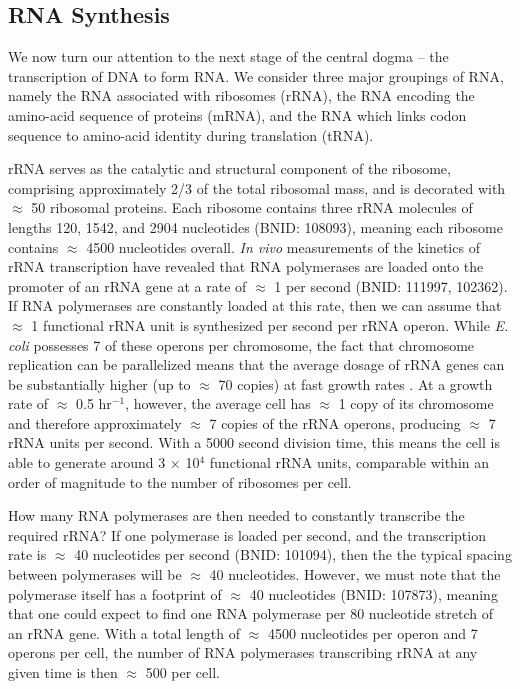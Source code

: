 \subsection{RNA Synthesis}\label{sec:RNA_synthesis}
We now turn our attention to the next stage of the central dogma -- the
transcription of DNA to form RNA. We consider three major groupings
of RNA, namely the RNA associated with ribosomes (rRNA), the RNA encoding the
amino-acid sequence of proteins (mRNA), and the RNA which links codon
sequence to amino-acid identity during translation (tRNA).


rRNA serves as the catalytic and structural component of the ribosome,
comprising approximately 2/3 of the total ribosomal mass, and is decorated
with $\approx$ 50 ribosomal proteins. Each ribosome contains three rRNA
molecules of lengths 120, 1542, and 2904 nucleotides (BNID: 108093), meaning
each ribosome contains $\approx$ 4500 nucleotides overall. \textit{In vivo}
measurements of the kinetics of rRNA transcription have revealed that RNA
polymerases are loaded onto the promoter of an rRNA gene at a rate of
$\approx$ 1 per second (BNID: 111997, 102362). If RNA polymerases are
constantly loaded at this rate, then we can assume that $\approx$ 1
functional rRNA unit is synthesized per second per rRNA operon. While
\textit{E. coli} possesses 7 of these operons per chromosome, the fact that
chromosome replication can be parallelized means that the average dosage of
rRNA genes can be substantially higher (up to $\approx$ 70 copies) at fast
growth rates \citep{dennis2004}. At a growth rate of $\approx$ 0.5 hr$^{-1}$, however, the
average cell has $\approx$ 1 copy of its chromosome and therefore
approximately $\approx$ 7 copies of the rRNA operons, producing
$\approx$ 7 rRNA units per second. With a 5000 second division time, this
means the cell is able to generate around 3 $\times$ 10$^4$ functional rRNA
units, comparable within an order of magnitude to the number of ribosomes per
cell.

How many RNA polymerases are then needed to constantly transcribe the
required rRNA? If one polymerase is loaded per second, and the transcription
rate is $\approx$ 40 nucleotides per second (BNID: 101094), then the the
typical spacing between polymerases will be $\approx$ 40 nucleotides.
However, we must note that the polymerase itself has a footprint of $\approx$
40 nucleotides (BNID: 107873), meaning that one could expect to find one RNA
polymerase per 80 nucleotide stretch of an rRNA gene. With a total length of
$\approx$ 4500 nucleotides per operon and 7 operons per cell, the number of
RNA polymerases transcribing rRNA at any given time is then $\approx$ 500 per
cell.

